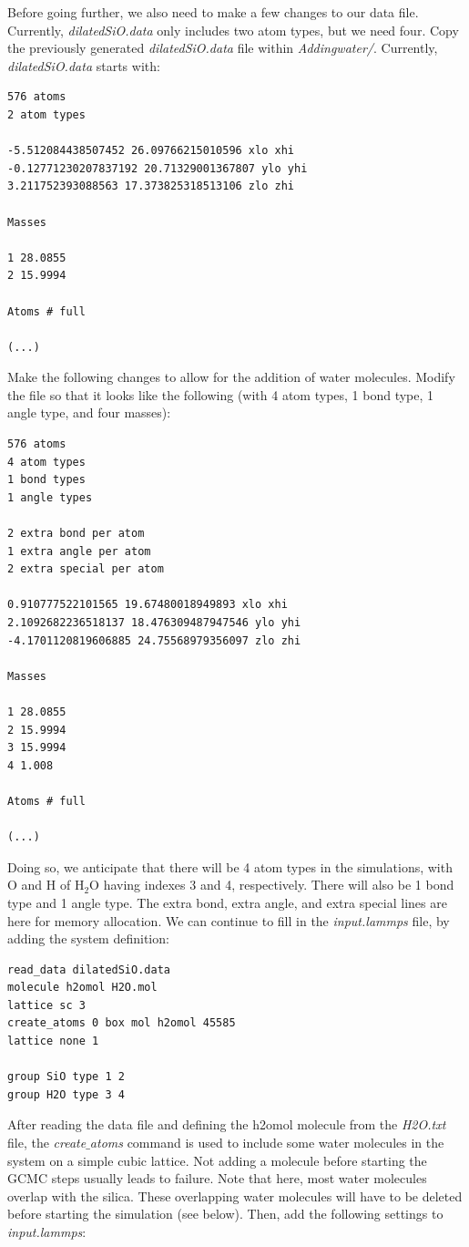 \documentclass[9pt,tutorial]{livecoms}
\begin{document}
Before going further, we also need to make a few changes to our data file. Currently, \textit{dilatedSiO.data} only includes two atom types, but we need four. Copy the previously generated \textit{dilatedSiO.data} file within \textit{Addingwater/}. Currently, \textit{dilatedSiO.data} starts with:
{\normalsize \begin{verbatim}
576 atoms
2 atom types

-5.512084438507452 26.09766215010596 xlo xhi
-0.12771230207837192 20.71329001367807 ylo yhi
3.211752393088563 17.373825318513106 zlo zhi

Masses

1 28.0855
2 15.9994

Atoms # full

(...)
\end{verbatim}}
Make the following changes to allow for the addition of water molecules. Modify the file so that it looks like the following 
(with 4 atom types, 1 bond type, 1 angle type, and four masses):
{\normalsize \begin{verbatim}
576 atoms
4 atom types
1 bond types
1 angle types

2 extra bond per atom
1 extra angle per atom
2 extra special per atom

0.910777522101565 19.67480018949893 xlo xhi
2.1092682236518137 18.476309487947546 ylo yhi
-4.1701120819606885 24.75568979356097 zlo zhi

Masses

1 28.0855
2 15.9994
3 15.9994
4 1.008

Atoms # full

(...)
\end{verbatim}}
Doing so, we anticipate that there will be 4 atom types in the simulations, with O and H of $\text{H}_2\text{O}$ having indexes 3 and 4,
respectively. There will also be 1 bond type and 1 angle type. The extra bond, extra angle, and extra special lines
are here for memory allocation. We can continue to fill in the \textit{input.lammps} file, by adding the system definition:
{\normalsize \begin{verbatim}
read_data dilatedSiO.data
molecule h2omol H2O.mol
lattice sc 3
create_atoms 0 box mol h2omol 45585
lattice none 1

group SiO type 1 2
group H2O type 3 4
\end{verbatim}}
After reading the data file and defining the h2omol molecule from the \textit{H2O.txt} file, the \textit{create$\_$atoms} command is used to include some water molecules in the system on a simple cubic lattice. Not adding a molecule before starting the GCMC steps usually leads to failure. Note that here, most water molecules overlap with the silica. These overlapping water molecules will have to be deleted before starting the simulation (see below). Then, add the following settings to \textit{input.lammps}:
\end{document}
